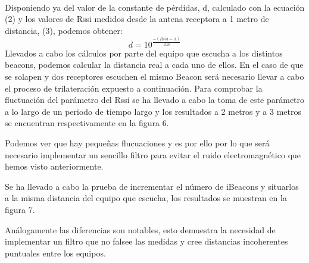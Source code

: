\documentclass[paper=a4, fontsize=11pt,twoside]{scrartcl}	%
\begin{document}
            \paragraph{}
            Disponiendo ya del valor de la constante de pérdidas, d, calculado con la ecuación (2) y los valores
            de Rssi medidos desde la antena receptora a 1 metro de distancia, (3), podemos obtener:
            \begin{equation}
                d= 10^\frac{-(Rssi - A)}{10n}
            \end{equation}
            Llevados a cabo los cálculos por parte del equipo que escucha a los distintos beacons, podemos calcular la distancia 
            real a cada uno de ellos. En el caso de que se solapen y dos receptores escuchen el mismo Beacon será necesario
            llevar a cabo el proceso de trilateración expuesto a continuación.
            Para comprobar la fluctuación del parámetro del Rssi se ha llevado a cabo la toma de este parámetro a lo largo de un 
            periodo de tiempo largo y los resultados a 2 metros y a 3 metros se encuentran respectivamente en la figura 6. 
 
            Podemos ver que hay pequeñas flucuaciones y es por ello por lo que será necesario implementar un sencillo filtro para
            evitar el ruido electromagnético que hemos visto anteriormente.
            
            Se ha llevado a cabo la prueba de incrementar el número de iBeacons y situarlos a la misma distancia del 
            equipo que escucha, los resultados se muestran en la figura 7.
            
            Análogamente las diferencias son notables, esto demuestra la necesidad de implementar
            un filtro que no falsee las medidas y cree distancias incoherentes puntuales entre los equipos.
            
\end{document}
